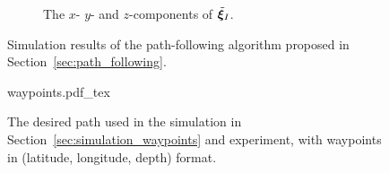 \begin{figure}[htb]
\begin{minipage}{0.48\textwidth}
        \vspace*{-3.5mm}

        \begin{subfigure}{\textwidth}
            
            \caption{The $x$- $y$- and $z$-components of $\tilde{\bm{\xi}}_I$.}
            \label{fig:waypoint_integral}
        \end{subfigure}
        \vspace*{-2mm}
    \end{minipage}
    \caption{Simulation results of the path-following algorithm proposed in Section~\ref{sec:path_following}.
    }
    \label{fig:waypoint_following}
\end{figure}

\begin{figure}[tb]
    \centering
    \def\svgwidth{0.48\textwidth}
    
    {waypoints.pdf_tex}
    \vspace*{-3.5mm}
    \caption{The desired path used in the simulation in Section~\ref{sec:simulation_waypoints} and experiment, with waypoints in (latitude, longitude, depth) format.}
    \label{fig:waypoints}
\end{figure}
